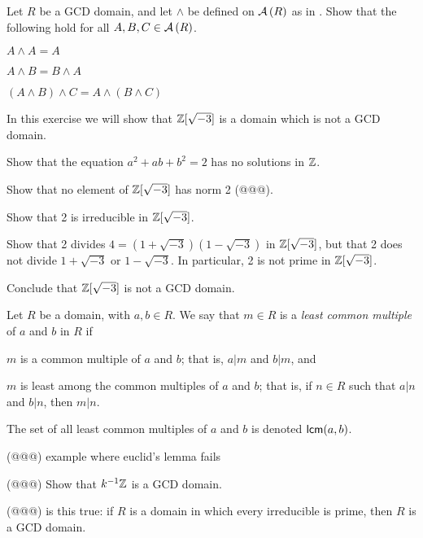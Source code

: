 \begin{exercise}
Let \(R\) be a GCD domain, and let \(\wedge\) be defined on \( \mathcal{A}\left(R\right) \) as in . Show that the following hold for all $A,B,C \in  \mathcal{A}\left(R\right) $.
\begin{proplist*}
\item \(A \wedge A = A\)
\item \(A \wedge B = B \wedge A\)
\item \((A \wedge B) \wedge C = A \wedge (B \wedge C)\)
\end{proplist*}
\end{exercise}

\begin{exercise} In this exercise we will show that \(\mathbb{Z}[\sqrt{-3}]\) is a domain which is not a GCD domain.
\begin{proplist}
\item Show that the equation \(a^2 + ab + b^2 = 2\) has no solutions in \(\mathbb{Z}\).
\item Show that no element of \(\mathbb{Z}[\sqrt{-3}]\) has norm 2 (@@@).
\item Show that 2 is irreducible in \(\mathbb{Z}[\sqrt{-3}]\).
\item Show that 2 divides \(4 = (1 + \sqrt{-3})(1 - \sqrt{-3})\) in \(\mathbb{Z}[\sqrt{-3}]\), but that 2 does not divide \(1 + \sqrt{-3}\) or \(1 - \sqrt{-3}\). In particular, 2 is not prime in \(\mathbb{Z}[\sqrt{-3}]\).
\item Conclude that \(\mathbb{Z}[\sqrt{-3}]\) is not a GCD domain.
\end{proplist}
\end{exercise}

\begin{dfn}
Let \(R\) be a domain, with \(a,b \in R\). We say that \(m \in R\) is a \emph{least common multiple}  of \(a\) and \(b\) in \(R\) if
\begin{proplist}
\item \(m\) is a common multiple of \(a\) and \(b\); that is, \(a|m\) and \(b|m\), and 
\item \(m\) is least among the common multiples of \(a\) and \(b\); that is, if \(n \in R\) such that \(a|n\) and \(b|n\), then \(m|n\).
\end{proplist}
The set of all least common multiples of \(a\) and \(b\) is denoted \(\mathsf{lcm}(a, b)\).
\end{dfn}

\begin{exercise}
(@@@) example where euclid's lemma fails
\end{exercise}

\begin{exercise}
(@@@) Show that \({k}^{-1}\mathbb{Z}\) is a GCD domain.
\end{exercise}

\begin{exercise}
(@@@) is this true: if \(R\) is a domain in which every irreducible is prime, then \(R\) is a GCD domain.
\end{exercise}
